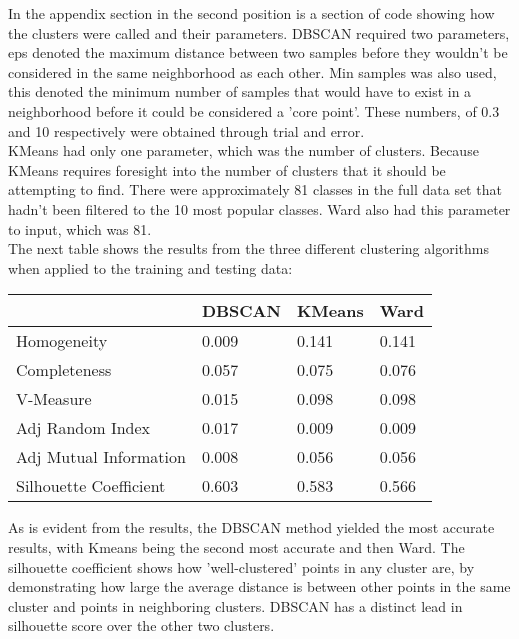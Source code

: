 \documentclass[11pt]{article}
\begin{document}
In the appendix section in the second position is a section of code showing how the clusters were called and their parameters. DBSCAN required two parameters, eps denoted the maximum distance between two samples before they wouldn't be considered in the same neighborhood as each other. Min samples was also used, this denoted the minimum number of samples that would have to exist in a neighborhood before it could be considered a 'core point'. These numbers, of 0.3 and 10 respectively were obtained through trial and error. \\

KMeans had only one parameter, which was the number of clusters. Because KMeans requires foresight into the number of clusters that it should be attempting to find. There were approximately 81 classes in the full data set that hadn't been filtered to the 10 most popular classes. Ward also had this parameter to input, which was 81. \\

The next table shows the results from the three different clustering algorithms when applied to the training and testing data:

\begin{center}
\begin{longtable}{| l | l | l | l |}
\hline
&DBSCAN                 & KMeans & Ward    \\
\hline
Homogeneity            & 0.009  & 0.141 & 0.141 \\
Completeness           & 0.057  & 0.075 & 0.076 \\
V-Measure              & 0.015  & 0.098 & 0.098 \\
Adj Random Index       & 0.017  & 0.009 & 0.009 \\
Adj Mutual Information & 0.008  & 0.056 & 0.056 \\
Silhouette Coefficient & 0.603  & 0.583 & 0.566 \\
\hline
\end{longtable}
\end{center}

As is evident from the results, the DBSCAN method yielded the most accurate results, with Kmeans being the second most accurate and then Ward. The silhouette coefficient shows how 'well-clustered' points in any cluster are, by demonstrating how large the average distance is between other points in the same cluster and points in neighboring clusters. DBSCAN has a distinct lead in silhouette score over the other two clusters.
\end{document}

